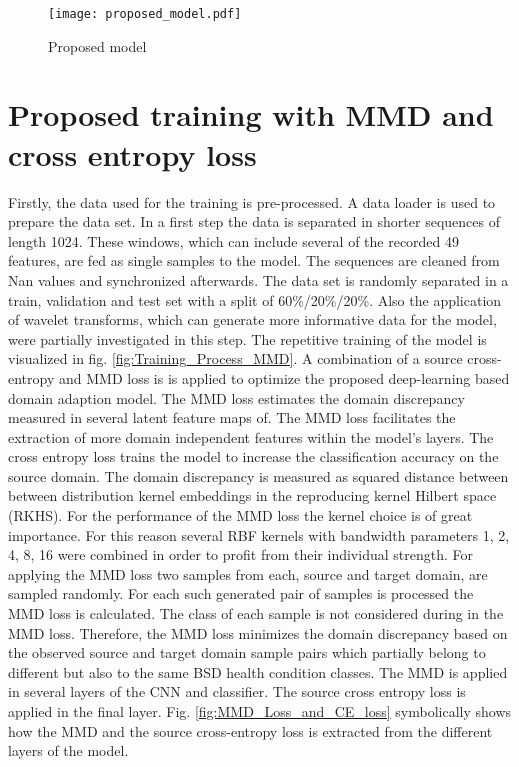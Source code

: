 \begin{figure}[H]
  \centering
  \texttt{[image: proposed\_model.pdf]}
  \caption {Proposed model} \label{fig:proposed_model}
\end{figure}


\section{Proposed training with MMD and cross entropy loss} \label{sec:Proposed_training}

Firstly, the data used for the training is pre-processed. A data loader is used to prepare the data set. In a first step the data is separated in shorter sequences of length 1024. These windows, which can include several of the recorded 49 features, are fed as single samples to the model. The sequences are cleaned from Nan values and synchronized afterwards. The data set is randomly separated in a train, validation and test set with a split of 60\%/20\%/20\%. Also the application of wavelet transforms, which can generate more informative data for the model, were partially investigated in this step. The repetitive training of the model is visualized in fig. \ref{fig:Training_Process_MMD}. A combination of a source cross-entropy and MMD loss is is applied to optimize the proposed deep-learning based domain adaption model. The MMD loss estimates the domain discrepancy measured in several latent feature maps of. The MMD loss facilitates the extraction of more domain independent features within the model's layers. The cross entropy loss trains the model to increase the classification accuracy on the source domain. The domain discrepancy is measured as squared distance between between distribution kernel embeddings in the reproducing kernel Hilbert space (RKHS). For the performance of the MMD loss the kernel choice is of great importance. For this reason several RBF kernels with bandwidth parameters 1, 2, 4, 8, 16 were combined in order to profit from their individual strength. For applying the MMD loss two samples from each, source and target domain, are sampled randomly. For each such generated pair of samples is processed the MMD loss is calculated. The class of each sample is not considered during in the MMD loss. Therefore, the MMD loss minimizes the domain discrepancy based on the observed source and target domain sample pairs which partially belong to different but also to the same BSD health condition classes. The MMD is applied in several layers of the CNN and classifier. The source cross entropy loss is applied in the final layer. Fig. \ref{fig:MMD_Loss_and_CE_loss} symbolically shows how the MMD and the source cross-entropy loss is extracted from the different layers of the model.

